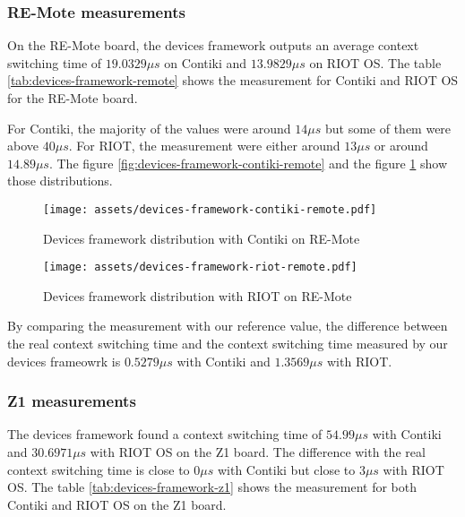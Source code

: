 \subsubsection{RE-Mote measurements}
On the RE-Mote board, the devices framework outputs an average context switching time of $19.0329\mu s$ on Contiki and $13.9829 \mu s$ on RIOT OS.
The table \ref{tab:devices-framework-remote} shows the measurement for Contiki and RIOT OS for the RE-Mote board.



For Contiki, the majority of the values were around $14\mu s$ but some of them were above $40\mu s$.
For RIOT, the measurement were either around $13 \mu s$ or around $14.89 \mu s$.
The figure \ref{fig:devices-framework-contiki-remote} and the figure \ref{fig:devices-framework-riot-remote} show those distributions.

\begin{figure}[!ht]
  \begin{minipage}{.45\textwidth}
      \centering
      \texttt{[image: assets/devices-framework-contiki-remote.pdf]}
      \caption{Devices framework distribution with Contiki on RE-Mote\label{fig:devices-framework-contiki-remote}}
  \end{minipage}\hfill
  \begin{minipage}{.45\textwidth}        
      \centering
      \texttt{[image: assets/devices-framework-riot-remote.pdf]}
      \caption{Devices framework distribution with RIOT on RE-Mote\label{fig:devices-framework-riot-remote}}
  \end{minipage}
\end{figure}

By comparing the measurement with our reference value, the difference between the real context switching time and the context switching time measured by our devices frameowrk is $0.5279\mu s$ with Contiki and $1.3569\mu s$ with RIOT.

\subsubsection{Z1 measurements}
The devices framework found a context switching time of $54.99\mu s$ with Contiki and $30.6971\mu s$ with RIOT OS on the Z1 board.
The difference with the real context switching time is close to $0\mu s$ with Contiki but close to $3\mu s$ with RIOT OS.
The table \ref{tab:devices-framework-z1} shows the measurement for both Contiki and RIOT OS on the Z1 board.

